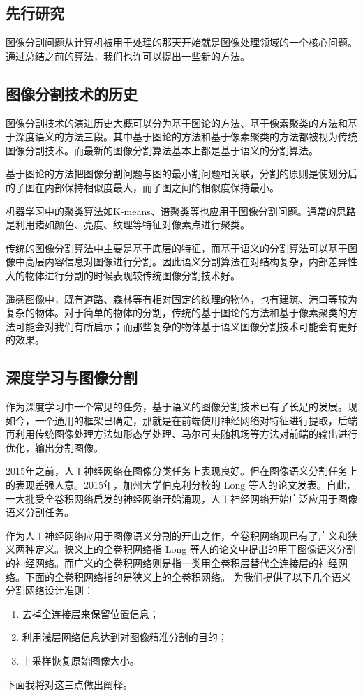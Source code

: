 \begin{spacing}{2}
    \section{先行研究}
\end{spacing}
图像分割问题从计算机被用于处理的那天开始就是图像处理领域的一个核心问题。通过总结之前的算法，我们也许可以提出一些新的方法。
\subsection{图像分割技术的历史}
图像分割技术的演进历史大概可以分为基于图论的方法、基于像素聚类的方法和基于深度语义的方法三段。其中基于图论的方法和基于像素聚类的方法都被视为传统图像分割技术。而最新的图像分割算法基本上都是基于语义的分割算法。

基于图论的方法把图像分割问题与图的最小割问题相关联，分割的原则是使划分后的子图在内部保持相似度最大，而子图之间的相似度保持最小。

机器学习中的聚类算法如K-means、谱聚类等也应用于图像分割问题。通常的思路是利用诸如颜色、亮度、纹理等特征对像素点进行聚类。

传统的图像分割算法中主要是基于底层的特征，而基于语义的分割算法可以基于图像中高层内容信息对图像进行分割。因此语义分割算法在对结构复杂，内部差异性大的物体进行分割的时候表现较传统图像分割技术好。

遥感图像中，既有道路、森林等有相对固定的纹理的物体，也有建筑、港口等较为复杂的物体。对于简单的物体的分割，传统的基于图论的方法和基于像素聚类的方法可能会对我们有所启示；而那些复杂的物体基于语义图像分割技术可能会有更好的效果。
\subsection{深度学习与图像分割}
作为深度学习中一个常见的任务，基于语义的图像分割技术已有了长足的发展。现如今，一个通用的框架已确定，那就是在前端使用神经网络对特征进行提取，后端再利用传统图像处理方法如形态学处理、马尔可夫随机场等方法对前端的输出进行优化，输出分割图像。

2015年之前，人工神经网络在图像分类任务上表现良好。但在图像语义分割任务上的表现差强人意。2015年，加州大学伯克利分校的 Long 等人的论文\cite{long2015fully}发表。自此，一大批受全卷积网络启发的神经网络开始涌现，人工神经网络开始广泛应用于图像语义分割任务。

作为人工神经网络应用于图像语义分割的开山之作，全卷积网络现已有了广义和狭义两种定义。狭义上的全卷积网络指 Long 等人的论文\cite{long2015fully}中提出的用于图像语义分割的神经网络。而广义的全卷积网络则是指一类用全卷积层替代全连接层的神经网络。下面的全卷积网络指的是狭义上的全卷积网络。
\cite{long2015fully}为我们提供了以下几个语义分割网络设计准则：
\begin{enumerate}
    \item 去掉全连接层来保留位置信息；
    \item 利用浅层网络信息达到对图像精准分割的目的；
    \item 上采样恢复原始图像大小。
\end{enumerate}
下面我将对这三点做出阐释。
